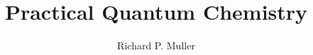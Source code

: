 \documentclass{report}
\begin{document}
\title{Practical Quantum Chemistry}
\author{Richard P. Muller}






\end{document}
